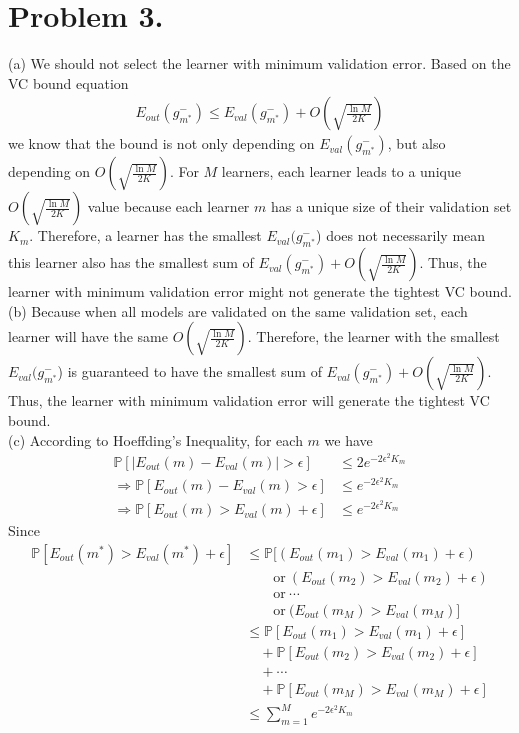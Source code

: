 \documentclass{article}
\begin{document}
    \section*{Problem 3.}
    (a) We should not select the learner with minimum validation error. Based on the VC bound equation
    \begin{align*}
        E_{out}(g_{m^*}^-) \leq E_{val}(g_{m^*}^-) + O(\sqrt{\frac{\ln M}{2K}})
    \end{align*}
    we know that the bound is not only depending on $E_{val}(g_{m^*}^-)$, but also depending on 
    $O(\sqrt{\frac{\ln M}{2K}})$. For $M$ learners, each learner leads to a unique $O(\sqrt{\frac{\ln M}{2K}})$ 
    value because each learner $m$ has a unique size of their validation set $K_m$. Therefore, a learner has the 
    smallest $E_{val}(g_{m^*}^-$) does not necessarily mean this learner also has the smallest sum of 
    $E_{val}(g_{m^*}^-) + O(\sqrt{\frac{\ln M}{2K}})$. Thus, the learner with minimum validation error might not 
    generate the tightest VC bound.\\
    (b) Because when all models are validated on the same validation set, each learner will have the same 
    $O(\sqrt{\frac{\ln M}{2K}})$. Therefore, the learner with the smallest $E_{val}(g_{m^*}^-$) is guaranteed to 
    have the smallest sum of $E_{val}(g_{m^*}^-) + O(\sqrt{\frac{\ln M}{2K}})$. Thus, the learner with minimum
    validation error will generate the tightest VC bound.\\
    (c) According to Hoeffding's Inequality, for each $m$ we have
    \begin{align*}
        \mathbb{P}[|E_{out}(m) - E_{val}(m)| > \epsilon] & \leq 2e^{-2 \epsilon^2 K_m}\\
        \Rightarrow \mathbb{P}[E_{out}(m) - E_{val}(m) > \epsilon] & \leq e^{-2 \epsilon^2 K_m}\\
        \Rightarrow \mathbb{P}[E_{out}(m) > E_{val}(m) + \epsilon] & \leq e^{-2 \epsilon^2 K_m}
    \end{align*}
    Since
    \begin{align*}
        \mathbb{P}[E_{out}(m^*) > E_{val}(m^*) + \epsilon] & 
        \leq \mathbb{P}[(E_{out}(m_1) > E_{val}(m_1) + \epsilon) \\
        & \qquad \text{or} \ (E_{out}(m_2) > E_{val}(m_2) + \epsilon) \\
        & \qquad \text{or} \ \cdots \\
        & \qquad \text{or} \ (E_{out}(m_M) > E_{val}(m_M)]\\
        & \leq \mathbb{P}[E_{out}(m_1) > E_{val}(m_1) + \epsilon]\\
        & \quad + \mathbb{P}[E_{out}(m_2) > E_{val}(m_2) + \epsilon]\\
        & \quad + \cdots\\
        & \quad + \mathbb{P}[E_{out}(m_M) > E_{val}(m_M) + \epsilon]\\
        & \leq \sum_{m=1}^{M} e^{-2 \epsilon^2 K_m}
    \end{align*}
\end{document}
